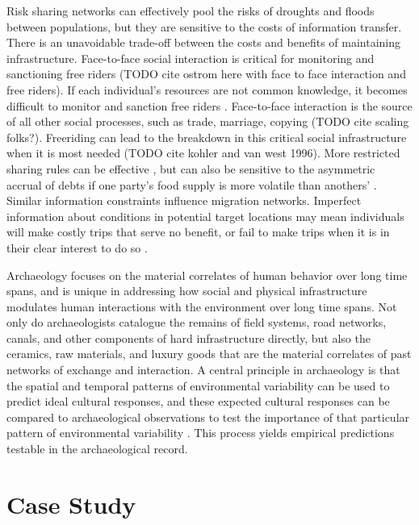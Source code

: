 \documentclass[10pt]{iopart}
\begin{document}
Risk sharing networks can effectively pool the risks of droughts and floods between populations, but they are sensitive to the costs of information transfer.  There is an unavoidable trade-off between the costs and benefits of maintaining infrastructure. Face-to-face social interaction is critical for monitoring and sanctioning free riders (TODO cite ostrom here with face to face interaction and free riders). If each individual's resources are not common knowledge, it becomes difficult to monitor and sanction free riders \parencite{Hao2015a}. Face-to-face interaction is the source of all other social processes, such as trade, marriage, copying (TODO cite scaling folks?). Freeriding can lead to the breakdown in this critical social infrastructure when it is most needed (TODO cite kohler and van west 1996). More restricted sharing rules can be effective \parencite{Hegmon1996}, but can also be sensitive to the asymmetric accrual of debts if one party's food supply is more volatile than anothers' \parencite{Crabtree2015}. Similar information constraints influence migration networks. Imperfect information about conditions in potential target locations may mean individuals will make costly trips that serve no benefit, or fail to make trips when it is in their clear interest to do so \parencite{Anderies2011a}. 

Archaeology focuses on the material correlates of human behavior over long time spans, and is unique in addressing how social and physical infrastructure modulates human interactions with the environment over long time spans. Not only do archaeologists catalogue the remains of field systems, road networks, canals, and other components of hard infrastructure directly, but also the ceramics, raw materials, and luxury goods that are the material correlates of past networks of exchange and interaction. A central principle in archaeology is that the spatial and temporal patterns of environmental variability can be used to predict ideal cultural responses, and these expected cultural responses can be compared to archaeological observations to test the importance of that particular pattern of environmental variability \parencite{halstead1989}. This process yields empirical predictions testable in the archaeological record. 


\section*{Case Study}
\end{document}
